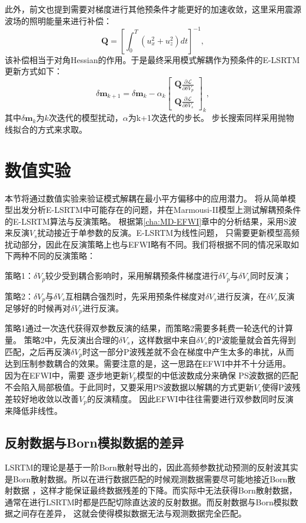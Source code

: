 此外，前文也提到需要对梯度进行其他预条件才能更好的加速收敛，这里采用震源波场的照明能量来进行补偿：
\begin{equation}
	\mathbf{Q} =\left[\int^T_0(u^2_x+u^2_z)dt\right]^{-1},
    \label{eq:Gradient_Illumination_LSRTM}
\end{equation}
该补偿相当于对角Hessian的作用。于是最终采用模式解耦作为预条件的E-LSRTM更新方式如下：
\begin{equation}
        \delta\mathbf{m}_{k+1}=\delta\mathbf{m}_{k}-\alpha_k
        \begin{bmatrix}\mathbf{Q}{\frac{\partial\mathcal{L}}{\partial \delta V_p}}\\
		\mathbf{Q}{\frac{\partial\mathcal{L}}{\partial \delta V_s}}\end{bmatrix}_{k},
        \label{eq:Gradientmethod_LSRTM}
\end{equation}
其中$\delta\mathbf{m}_{k}$为$k$次迭代的模型扰动，$\alpha$为k+1次迭代的步长。
步长搜索同样采用抛物线拟合的方式来求取。
\section{数值实验}
本节将通过数值实验来验证模式解耦在最小平方偏移中的应用潜力。
将从简单模型出发分析E-LSRTM中可能存在的问题，并在Marmousi-II模型上测试解耦预条件的E-LSRTM算法与反演策略。
根据第\ref{cha:MD-EFWI}章中的分析结果，采用S波来反演$V_s$扰动接近于单参数的反演。E-LSRTM为线性问题，
只需要更新模型高频扰动部分，因此在反演策略上也与EFWI略有不同。我们将根据不同的情况采取如下两种不同的反演策略：

策略1：$\delta V_p$较少受到耦合影响时，采用解耦预条件梯度进行$\delta V_p$与$\delta V_s$同时反演；

策略2：$\delta V_p$与$\delta V_s$互相耦合强烈时，先采用预条件梯度对$\delta V_s$进行反演，在$\delta
V_s$反演足够好的时候再对$\delta V_p$进行反演。

策略1通过一次迭代获得双参数反演的结果，而策略2需要多耗费一轮迭代的计算量。
策略2中，先反演出合理的$\delta V_s$，这样数据中来自$\delta
V_s$的P波能量就会首先得到匹配，之后再反演$\delta
V_p$时这一部分P波残差就不会在梯度中产生太多的串扰，从而达到压制参数耦合的效果。需要注意的是，这一思路在EFWI中并不十分适用。
因为在EFWI中，需要
逐步地更新$V_p$模型的中低波数成分来确保
PS波数据的匹配不会陷入局部极值。于此同时，又要采用PS波数据以解耦的方式更新$V_s$使得P波残差较好地收敛以改善$V_p$的反演精度。
因此EFWI中往往需要进行双参数同时反演来降低非线性。
\subsection{反射数据与Born模拟数据的差异}
LSRTM的理论是基于一阶Born散射导出的，因此高频参数扰动预测的反射波其实是Born散射数据。所以在进行数据匹配的时候观测数据需要尽可能地接近Born散射数据
，这样才能保证最终数据残差的下降。而实际中无法获得Born散射数据，通常在进行LSRTM时都是匹配切除直达波的反射数据。而反射数据与Born模拟数据之间存在差异，
这就会使得模拟数据无法与观测数据完全匹配。

